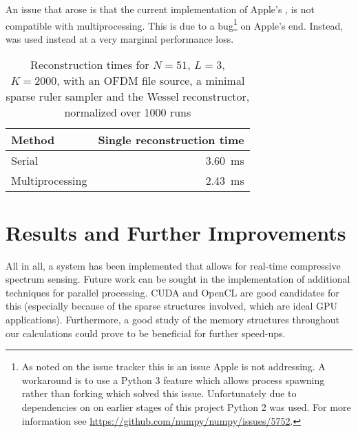 \documentclass[a4paper, openany, oneside]{memoir}
\begin{document}
An issue that arose is that the current implementation of Apple's , is not compatible with multiprocessing. This is due to a bug\footnote{As noted on the  issue tracker this is an issue Apple is not addressing. A workaround is to use a Python 3 feature which allows process spawning rather than forking which solved this issue. Unfortunately due to dependencies on  on earlier stages of this project Python 2 was used. For more information see \url{https://github.com/numpy/numpy/issues/5752}.} on Apple's end. Instead,  was used instead at a very marginal performance loss.

\begin{table}
    \centering
    \caption{Reconstruction times for $N = 51$, $L=3$, $K=2000$, with an OFDM file source, a minimal sparse ruler sampler and the Wessel reconstructor, normalized over 1000 runs}
    \label{tab:mp}
    \begin{tabular}{lr}
        \toprule
        Method          & Single reconstruction time\\
        \midrule
        Serial          & \SI{3.60}{\milli\second}\\
        Multiprocessing & \SI{2.43}{\milli\second}\\
        \bottomrule
    \end{tabular}
\end{table}

\section{Results and Further Improvements}
\label{sec:results}
All in all, a system has been implemented that allows for real-time compressive spectrum sensing. Future work can be sought in the implementation of additional techniques for parallel processing. CUDA and OpenCL are good candidates for this (especially because of the sparse structures involved, which are ideal GPU applications). Furthermore, a good study of the memory structures throughout our calculations could prove to be beneficial for further speed-ups.
\end{document}
